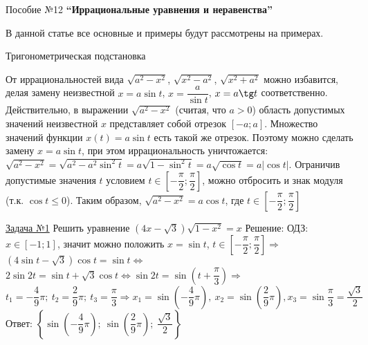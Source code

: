 \documentclass[a4paper,12pt]{article} %
\date{}
\author{}
\begin{document}
\begin{flushleft}
{Пособие №12}
\hfill
{\bf ``Иррациональные уравнения и неравенства''}
\end{flushleft}				

В данной статье все основные и примеры будут рассмотрены на примерах.

\begin{center}
{\large Тригонометрическая подстановка}
\end{center}

От иррациональностей вида $\sqrt{a^2-x^2}$, $\sqrt{x^2-a^2}$, $\sqrt{x^2+a^2}$
можно избавится, делая замену неизвестной $x=a\sin t$, $x=\dfrac{a}{\sin t}$, 
$x = a\tg t$ соответственно. Действительно, в выражении $\sqrt{a^2-x^2}$ (считая, что $a>0$)
область допустимых значений неизвестной $x$ представляет собой отрезок $[-a;a]$.
Множество значений функции $x(t) = a\sin t$ есть такой же отрезок. Поэтому можно 
сделать замену $x=a\sin t$, при этом иррациональность уничтожается: 
$\sqrt{a^2-x^2}=\sqrt{a^2-a^2\sin^2 t}=a\sqrt{1-\sin^2t}=a\sqrt{\cos t}=a|\cos t|$.
Ограничив допустимые значения $t$ условием $t \in \left[-\dfrac{\pi}{2}; \dfrac{\pi}{2}\right]$,
можно отбросить и знак модуля (т.к. $\cos t \le 0$). Таким образом, $\sqrt{a^2-x^2}=a \cos t$,
где $t \in \left[-\dfrac{\pi}{2}; \dfrac{\pi}{2}\right]$

\label{Problem1}
\underline{Задача №1}
Решить уравнение $(4x-\sqrt3)\sqrt{1-x^2}=x$\newline
Решение: ОДЗ: $x\in [-1; 1]$, значит можно положить $x=\sin t$, 
	$t\in \left[ -\dfrac{\pi}{2};\dfrac{\pi}{2} \right] \Rightarrow $\\$(4\sin t-\sqrt3)\cos t=\sin t \Leftrightarrow$
	$2\sin 2t=\sin t+\sqrt3 \cos t \Leftrightarrow \sin 2t=\sin\left(t+\dfrac{\pi}{3}\right) \Rightarrow$\\
	$
	t_1 = -\dfrac{4}{9}\pi;\ t_2 = \dfrac{2}{9} \pi;\ t_3 = \dfrac{\pi}{3} \Rightarrow
	x_1 = \sin\left(-\dfrac{4}{9}\pi\right),\ x_2 = \sin\left(\dfrac{2}{9}\pi\right),x_3=\sin\dfrac{\pi}{3}=\dfrac{\sqrt3}{2}
	$\\
Ответ: $\left\{ \sin\left(-\dfrac{4}{9}\pi\right);\ \sin\left( \dfrac{2}{9}\pi \right);\ \dfrac{\sqrt3}{2} \right\}$
\end{document}
